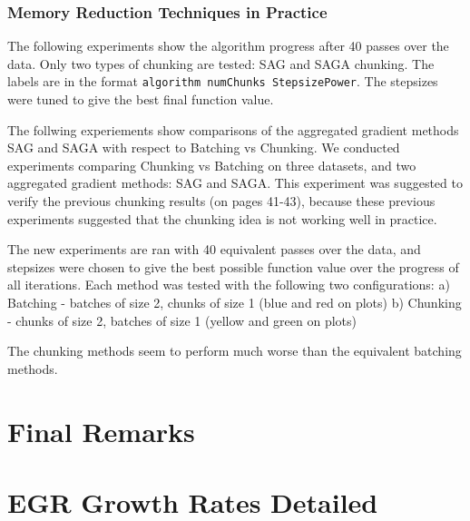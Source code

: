 \documentclass[11pt]{article}
\begin{document}
   \subsubsection{Memory Reduction Techniques in Practice}
   
   The following experiments show the algorithm progress after 40 passes over the data. Only two types of chunking are tested: SAG and SAGA chunking. The labels are in the format \texttt{algorithm numChunks StepsizePower}. The stepsizes were tuned to give the best final function value. 
   
   The follwing experiements show comparisons of the aggregated gradient methods SAG and SAGA with respect to Batching vs Chunking. We conducted experiments comparing Chunking vs Batching on three datasets, and two aggregated gradient methods: SAG and SAGA. This experiment was suggested to verify the previous chunking results (on pages 41-43), because these previous experiments suggested that the chunking idea is not working well in practice. 

   The new experiments are ran with 40 equivalent passes over the data, and stepsizes were chosen to give the best possible function value over the progress of all iterations. Each method was tested with the following two configurations:
   a) Batching - batches of size 2, chunks of size 1  (blue and red on plots)
   b) Chunking - chunks of size 2, batches of size 1 (yellow and green on plots)

   The chunking methods seem to perform much worse than the equivalent batching methods.

\section{Final Remarks} \label{finalr}


 \small 




\appendix 

\section{EGR Growth Rates Detailed} \label{appendix:EGRGrowthRatesDetailed}
\end{document}
